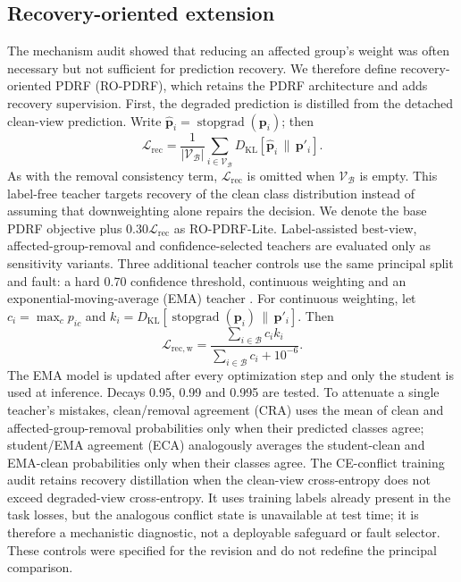 \documentclass[11pt]{article}
\begin{document}
\subsection{Recovery-oriented extension}

The mechanism audit showed that reducing an affected group's weight was often necessary but not sufficient for prediction recovery. We therefore define recovery-oriented PDRF (RO-PDRF), which retains the PDRF architecture and adds recovery supervision. First, the degraded prediction is distilled from the detached clean-view prediction. Write $\widehat{\mathbf p}_i=\operatorname{stopgrad}(\mathbf p_i)$; then
\begin{equation}
\mathcal L_{\mathrm{rec}}=\frac{1}{|\mathcal V_{\mathcal B}|}
\sum_{i\in\mathcal V_{\mathcal B}}D_{\mathrm{KL}}\!\left[\widehat{\mathbf p}_i\,\|\,\mathbf p'_i\right].
\end{equation}
As with the removal consistency term, $\mathcal L_{\mathrm{rec}}$ is omitted when $\mathcal V_{\mathcal B}$ is empty.
This label-free teacher targets recovery of the clean class distribution instead of assuming that downweighting alone repairs the decision. We denote the base PDRF objective plus $0.30\mathcal L_{\mathrm{rec}}$ as RO-PDRF-Lite. Label-assisted best-view, affected-group-removal and confidence-selected teachers are evaluated only as sensitivity variants. Three additional teacher controls use the same principal split and fault: a hard 0.70 confidence threshold, continuous weighting and an exponential-moving-average (EMA) teacher \citep{tarvainen2017mean}. For continuous weighting, let $c_i=\max_c p_{ic}$ and $k_i=D_{\mathrm{KL}}[\operatorname{stopgrad}(\mathbf p_i)\,\|\,\mathbf p'_i]$. Then
\begin{equation}
\mathcal L_{\mathrm{rec,w}}=
\frac{\sum_{i\in\mathcal B}c_i k_i}
{\sum_{i\in\mathcal B}c_i+10^{-6}}.
\end{equation}
The EMA model is updated after every optimization step and only the student is used at inference. Decays 0.95, 0.99 and 0.995 are tested. To attenuate a single teacher's mistakes, clean/removal agreement (CRA) uses the mean of clean and affected-group-removal probabilities only when their predicted classes agree; student/EMA agreement (ECA) analogously averages the student-clean and EMA-clean probabilities only when their classes agree. The CE-conflict training audit retains recovery distillation when the clean-view cross-entropy does not exceed degraded-view cross-entropy. It uses training labels already present in the task losses, but the analogous conflict state is unavailable at test time; it is therefore a mechanistic diagnostic, not a deployable safeguard or fault selector. These controls were specified for the revision and do not redefine the principal comparison.
\end{document}
